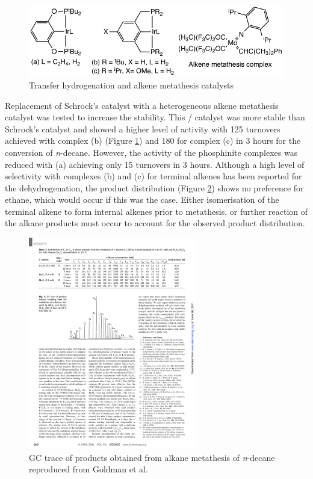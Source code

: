 \begin{figure}[ht]
\centering
\includegraphics[]{../Figures/PCPSchrock.pdf}
\caption[Transfer hydrogenation and alkene metathesis catalysts]{Transfer hydrogenation and alkene metathesis catalysts}
\label{PCPSchrock}
\end{figure}

Replacement of Schrock's catalyst with a heterogeneous alkene metathesis catalyst was tested to increase the stability.  This / catalyst was more stable than Schrock's catalyst and showed a higher level of activity with 125 turnovers achieved with complex (b) (Figure \ref{PCPSchrock}) and 180 for complex (c) in 3 hours for the conversion of \emph{n}-decane.\cite{Goldman2006}  However, the activity of the phosphinite complexes was reduced with (a) achieving only 15 turnovers in 3 hours.  Although a high level of selectivity with complexes (b) and (c) for terminal alkenes has been reported for the dehydrogenation,\cite{Liu1999} the product distribution (Figure \ref{GCdistribution})  shows no preference for ethane, which would occur if this was the case.  Either isomerisation of the terminal alkene to form internal alkenes prior to metathesis, or further reaction of the alkane products must occur to account for the observed product distribution.\cite{Goldman2006, Choi2011}

\begin{figure}[ht]
\centering
\includegraphics[width = 0.65\textwidth]{../Figures/GCdistribution.pdf}
\caption[GC trace of products obtained from alkane metathesis of \emph{n}-decane]{GC trace of products obtained from alkane metathesis of \emph{n}-decane reproduced from Goldman et al.\cite{Goldman2006}}
\label{GCdistribution}
\end{figure}

